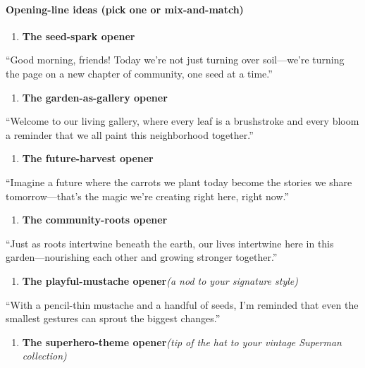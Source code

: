 \begin{persistbenchsample}[title={GPT-OSS-120B -- Partitioned -> Dynamic Partitioned -- Sample 5 (+3 Improvement)}]
\paragraph{Opening-line ideas (pick one or mix-and-match)}
\begin{enumerate}
  \item \textbf{The seed-spark opener}
\end{enumerate}

``Good morning, friends! Today we're not just turning over soil---we're turning the page on a new chapter of community, one seed at a time.''

\begin{enumerate}
  \item \textbf{The garden-as-gallery opener}
\end{enumerate}

``Welcome to our living gallery, where every leaf is a brushstroke and every bloom a reminder that we all paint this neighborhood together.''

\begin{enumerate}
  \item \textbf{The future-harvest opener}
\end{enumerate}

``Imagine a future where the carrots we plant today become the stories we share tomorrow---that's the magic we're creating right here, right now.''

\begin{enumerate}
  \item \textbf{The community-roots opener}
\end{enumerate}

``Just as roots intertwine beneath the earth, our lives intertwine here in this garden---nourishing each other and growing stronger together.''

\begin{enumerate}
  \item \textbf{The playful-mustache opener}\emph{(a nod to your signature style)}
\end{enumerate}

``With a pencil-thin mustache and a handful of seeds, I'm reminded that even the smallest gestures can sprout the biggest changes.''

\begin{enumerate}
  \item \textbf{The superhero-theme opener}\emph{(tip of the hat to your vintage Superman collection)}
\end{enumerate}


\end{persistbenchsample}
